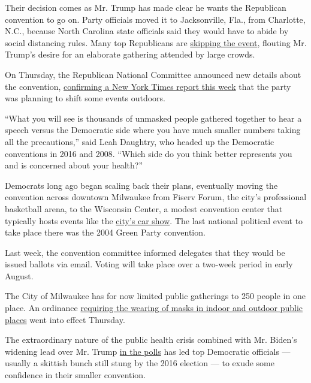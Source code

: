 Their decision comes as Mr. Trump has made clear he wants the Republican
convention to go on. Party officials moved it to Jacksonville, Fla.,
from Charlotte, N.C., because North Carolina state officials said they
would have to abide by social distancing rules. Many top Republicans are
\href{https://www.nytimes3xbfgragh.onion/2020/07/13/us/politics/florida-virus-republican-convention.html}{skipping
the event}, flouting Mr. Trump's desire for an elaborate gathering
attended by large crowds.

On Thursday, the Republican National Committee announced new details
about the convention,
\href{https://www.nytimes3xbfgragh.onion/2020/07/14/us/politics/republican-convention-jacksonville-virus-outdoors.html}{confirming
a New York Times report this week} that the party was planning to shift
some events outdoors.

``What you will see is thousands of unmasked people gathered together to
hear a speech versus the Democratic side where you have much smaller
numbers taking all the precautions,'' said Leah Daughtry, who headed up
the Democratic conventions in 2016 and 2008. ``Which side do you think
better represents you and is concerned about your health?''

Democrats long ago began scaling back their plans, eventually moving the
convention across downtown Milwaukee from Fiserv Forum, the city's
professional basketball arena, to the Wisconsin Center, a modest
convention center that typically hosts events like the
\href{http://autoshowmilwaukee.com/}{city's car show}. The last national
political event to take place there was the 2004 Green Party convention.

Last week, the convention committee informed delegates that they would
be issued ballots via email. Voting will take place over a two-week
period in early August.

The City of Milwaukee has for now limited public gatherings to 250
people in one place. An ordinance
\href{https://city.milwaukee.gov/Coronavirus/Prevention\#masks}{requiring
the wearing of masks in indoor and outdoor public places} went into
effect Thursday.

The extraordinary nature of the public health crisis combined with Mr.
Biden's widening lead over Mr. Trump
\href{https://www.nytimes3xbfgragh.onion/2020/07/16/upshot/polls-biden-trump-how-accurate.html}{in
the polls} has led top Democratic officials --- usually a skittish bunch
still stung by the 2016 election --- to exude some confidence in their
smaller convention.

